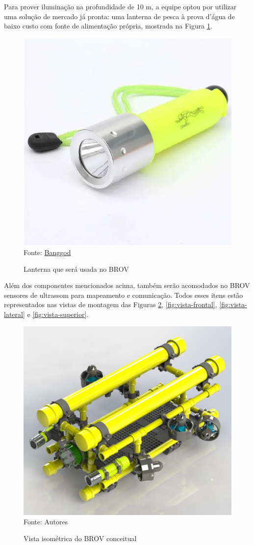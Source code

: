 Para prover iluminação na profundidade de 10 m, a equipe optou por utilizar uma solução de mercado já pronta: uma lanterna de pesca à prova d'água de baixo custo com fonte de alimentação própria, mostrada na Figura \ref{fig:lanterna}.

\begin{figure}[h]
	\centering
	\caption{Lanterna que será usada no BROV}
	\label{fig:lanterna}
	\includegraphics[width=0.4\linewidth]{images/lanterna}\\
	\footnotesize Fonte: \href{https://www.banggood.com/pt/Wholesale-Upgrade-2-T6-1600LM-3-Modes-Waterproof-LED-Flashlight-p-54536.html?imageAb=2&utm_campaign=3820755_54536&utm_content=3853&p=0101161305742201503R&cur_warehouse=CN&akmClientCountry=BR}{Banggod}
\end{figure}

Além dos componentes mencionados acima, também serão acomodados no BROV sensores de ultrassom para mapeamento e comunicação. Todos esses itens estão representados nas vistas de montagem das Figuras \ref{fig:vista-isometrica}, \ref{fig:vista-frontal}, \ref{fig:vista-lateral} e \ref{fig:vista-superior}.

\begin{figure}[h!]
	\centering
	\caption{Vista isométrica do BROV conceitual}
	\label{fig:vista-isometrica}
	\includegraphics[width=0.7\linewidth]{images/vista-isometrica-cut}\\
	\footnotesize Fonte: Autores
\end{figure}

